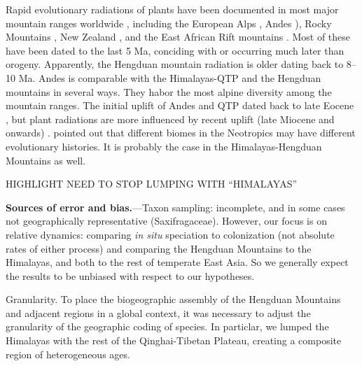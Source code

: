 



Rapid evolutionary radiations of plants have been documented in most major mountain ranges worldwide \citep[reviewed in][]{Hughes2015}, including the European Alps \citep{Roquet2013}, Andes \citep[e.g.][]{Hughes2006,Luebert2014}), Rocky Mountains \citep{DrummondC2012}, New Zealand \citep{Joly2014}, and the East African Rift mountains \citep{Linder2014}. Most of these have been dated to the last 5 Ma, conciding with or occurring much later than orogeny. Apparently, the Hengduan mountain radiation is older dating back to 8--10 Ma. Andes is comparable with the Himalayas-QTP and the Hengduan mountains in several ways. They habor the most alpine diversity among the mountain ranges. The initial uplift of Andes and QTP dated back to late Eocene \citep{Gregory-Wodzicki2000,Graham2009}, but plant radiations are more influenced by recent uplift (late Miocene and onwards) \citep{Hughes2013,Luebert2014,Hughes2015,Madrinan2013}. \citet{Hughes2013} pointed out that different biomes in the Neotropics may have different evolutionary histories. It is probably the case in the Himalayas-Hengduan Mountains as well. 

HIGHLIGHT NEED TO STOP LUMPING WITH ``HIMALAYAS''

\textbf{Sources of error and bias.}---Taxon sampling: incomplete, and in some cases not geographically representative (Saxifragaceae). However, our focus is on relative dynamics: comparing \textit{in situ} speciation to colonization (not absolute rates of either process) and comparing the Hengduan Mountains to the Himalayas, and both to the rest of temperate East Asia. So we generally expect the results to be unbiased with respect to our hypotheses.

Granularity. To place the biogeographic assembly of the Hengduan Mountains and adjacent regions in a global context, it was necessary to adjust the granularity of the geographic coding of species. In particlar, we lumped the Himalayas with the rest of the Qinghai-Tibetan Plateau, creating a composite region of heterogeneous ages.


